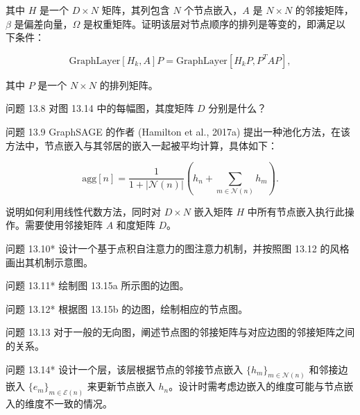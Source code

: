 其中 \(H\) 是一个 \(D \times N\) 矩阵，其列包含 \(N\) 个节点嵌入，\(A\) 是 \(N \times N\) 的邻接矩阵，\(\beta\) 是偏差向量，\(\Omega\) 是权重矩阵。证明该层对节点顺序的排列是等变的，即满足以下条件：

\begin{equation}
\text{GraphLayer}[H_k, A]P = \text{GraphLayer}[H_k P, P^T AP], 
\end{equation}

其中 \(P\) 是一个 \(N \times N\) 的排列矩阵。

问题 13.8 对图 13.14 中的每幅图，其度矩阵 \(D\) 分别是什么？

问题 13.9 GraphSAGE 的作者 (Hamilton et al., 2017a) 提出一种池化方法，在该方法中，节点嵌入与其邻居的嵌入一起被平均计算，具体如下：

\begin{equation}
\text{agg}[n] = \frac{1}{1 + |\mathcal{N}(n)|} \left( h_n + \sum_{m \in \mathcal{N}(n)} h_m \right). 
\end{equation}

说明如何利用线性代数方法，同时对 \(D \times N\) 嵌入矩阵 \(H\) 中所有节点嵌入执行此操作。需要使用邻接矩阵 \(A\) 和度矩阵 \(D\)。

问题 13.10* 设计一个基于点积自注意力的图注意力机制，并按照图 13.12 的风格画出其机制示意图。

问题 13.11* 绘制图 13.15a 所示图的边图。

问题 13.12* 根据图 13.15b 的边图，绘制相应的节点图。

问题 13.13 对于一般的无向图，阐述节点图的邻接矩阵与对应边图的邻接矩阵之间的关系。

问题 13.14* 设计一个层，该层根据节点的邻接节点嵌入 \(\{h_m\}_{m\in\mathcal{N}(n)}\) 和邻接边嵌入 \(\{e_m\}_{m\in\mathcal{E}(n)}\) 来更新节点嵌入 \(h_n\)。设计时需考虑边嵌入的维度可能与节点嵌入的维度不一致的情况。


